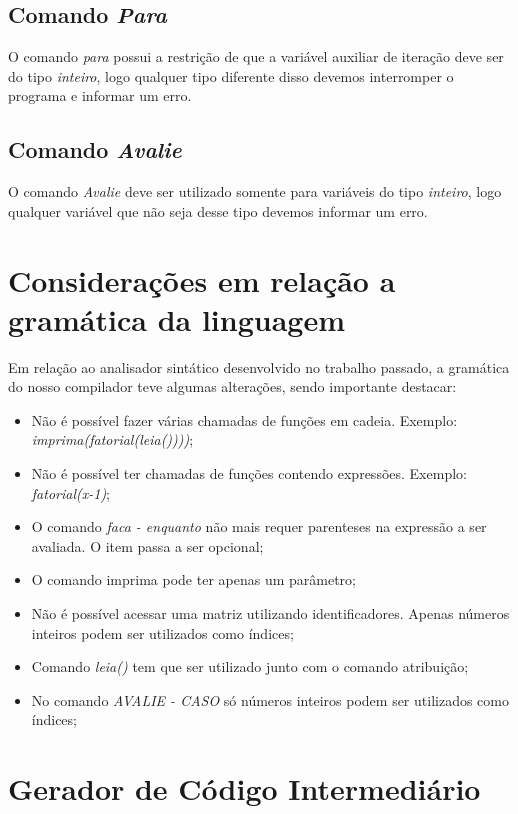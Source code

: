 \documentclass[
12pt,				%
a4paper,			%
english,			%
french,				%
spanish,			%
brazil,				%
article
]{abntex2}
\begin{document}
\subsection{Comando \textit{Para}}
O comando \textit{para} possui a restrição de que a variável auxiliar de iteração deve ser do tipo \textit{inteiro}, logo qualquer tipo diferente disso devemos interromper o programa e informar um erro.

\subsection{Comando \textit{Avalie}}
O comando \textit{Avalie} deve ser utilizado somente para variáveis do tipo \textit{inteiro}, logo qualquer variável que não seja desse tipo devemos informar um erro.

\section{Considerações em relação a gramática da linguagem}
Em relação ao analisador sintático desenvolvido no trabalho passado, a gramática do nosso compilador teve algumas alterações, sendo importante destacar:

\begin{itemize}
	\item Não é possível fazer várias chamadas de funções em cadeia. Exemplo: \textit{imprima(fatorial(leia())))};
	\item Não é possível ter chamadas de funções contendo expressões. Exemplo: \textit{fatorial(x-1)};
	\item O comando \textit{faca - enquanto} não mais requer parenteses na expressão a ser avaliada. O item passa a ser opcional;
	\item O comando imprima pode ter apenas um parâmetro;
	\item Não é possível acessar uma matriz utilizando identificadores. Apenas números inteiros podem ser utilizados como índices;
	\item Comando \textit{leia()} tem que ser utilizado junto com o comando atribuição;
	\item No comando \textit{AVALIE - CASO} só números inteiros podem ser utilizados como índices;
\end{itemize}

\section{Gerador de Código Intermediário}
\end{document}
